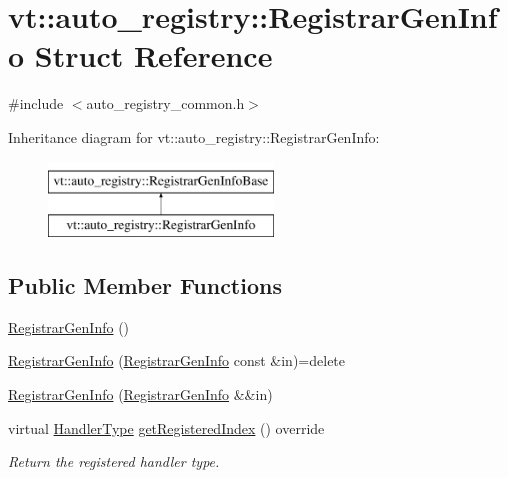 \hypertarget{structvt_1_1auto__registry_1_1_registrar_gen_info}{}\section{vt\+:\+:auto\+\_\+registry\+:\+:Registrar\+Gen\+Info Struct Reference}
\label{structvt_1_1auto__registry_1_1_registrar_gen_info}


{\ttfamily \#include $<$auto\+\_\+registry\+\_\+common.\+h$>$}

Inheritance diagram for vt\+:\+:auto\+\_\+registry\+:\+:Registrar\+Gen\+Info\+:\begin{figure}[H]
\begin{center}
\leavevmode
\includegraphics[height=2.000000cm]{structvt_1_1auto__registry_1_1_registrar_gen_info}
\end{center}
\end{figure}
\subsection*{Public Member Functions}
\begin{DoxyCompactItemize}
\item 
\hyperlink{structvt_1_1auto__registry_1_1_registrar_gen_info_a0075b2464a5cb4b940520ea19bb85682}{Registrar\+Gen\+Info} ()
\item 
\hyperlink{structvt_1_1auto__registry_1_1_registrar_gen_info_ace14d4ef31eea02efe9a5accc19c8066}{Registrar\+Gen\+Info} (\hyperlink{structvt_1_1auto__registry_1_1_registrar_gen_info}{Registrar\+Gen\+Info} const \&in)=delete
\item 
\hyperlink{structvt_1_1auto__registry_1_1_registrar_gen_info_ad5ef39d7dbbe3557ff4595fa85fdc3db}{Registrar\+Gen\+Info} (\hyperlink{structvt_1_1auto__registry_1_1_registrar_gen_info}{Registrar\+Gen\+Info} \&\&in)
\item 
virtual \hyperlink{namespacevt_af64846b57dfcaf104da3ef6967917573}{Handler\+Type} \hyperlink{structvt_1_1auto__registry_1_1_registrar_gen_info_a749795c8978dbc76aa851182cb00b1b9}{get\+Registered\+Index} () override
\begin{DoxyCompactList}\small\item\em Return the registered handler type. \end{DoxyCompactList}\end{DoxyCompactItemize}
